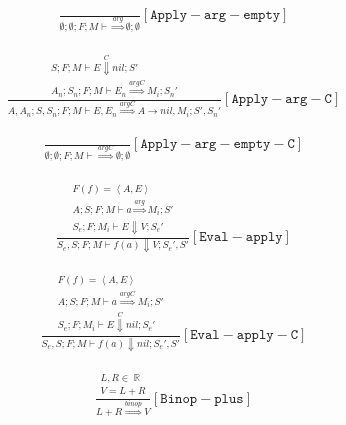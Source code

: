 \documentclass{scrartcl}
\DeclareMathOperator{\numtype}{\mathbb{R}}
\begin{document}
    \begin{align*}
    \frac{}{
        \emptyset; \emptyset; F; M \vdash \overset{arg}{\Rightarrow} \emptyset; \emptyset
    }[\mathtt{Apply-arg-empty}]
    \end{align*}
    
    \begin{align*}
    \frac{
        \begin{matrix}
        S; F; M \vdash E \overset{C}{\Downarrow} nil; S' \\
        A_n; S_n; F; M \vdash E_n \overset{argC}{\Rightarrow} M_i; S_n'
        \end{matrix}
    }{
        A, A_n; S, S_n; F; M \vdash E, E_n \overset{argC}{\Rightarrow} A \to nil, M_i; S', S_n'
    }[\mathtt{Apply-arg-C}]
    \end{align*}
    
    \begin{align*}
    \frac{}{
        \emptyset; \emptyset; F; M \vdash \overset{argC}{\Rightarrow} \emptyset; \emptyset
    }[\mathtt{Apply-arg-empty-C}]
    \end{align*}
    
    \begin{align*}
    \frac{
        \begin{matrix}
        F(f) = \left< A, E \right> \\
        A; S; F; M \vdash a \overset{arg}{\Rightarrow} M_i; S' \\
        S_e; F; M_i \vdash E \Downarrow V; S_e'
        \end{matrix}
    }{
        S_e, S; F; M \vdash f(a) \Downarrow V; S_e', S'
    }[\mathtt{Eval-apply}]
    \end{align*}
    
    \begin{align*}
    \frac{
        \begin{matrix}
        F(f) = \left< A, E \right> \\
        A; S; F; M \vdash a \overset{argC}{\Rightarrow} M_i; S' \\
        S_e; F; M_i \vdash E \overset{C}{\Downarrow} nil; S_e'
        \end{matrix}
    }{
        S_e, S; F; M \vdash f(a) \Downarrow nil; S_e', S'
    }[\mathtt{Eval-apply-C}]
    \end{align*}
    
    \begin{align*}
    \frac{
        \begin{matrix}
        L, R \in \numtype \\
        V = L + R
        \end{matrix}
    }{
        L + R \overset{binop}{\Rightarrow} V
    }[\mathtt{Binop-plus}]
    \end{align*}
    
\end{document}
